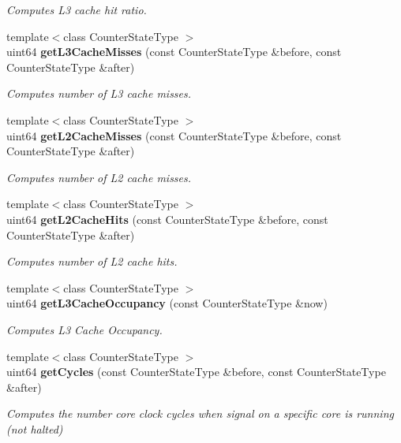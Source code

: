 \begin{DoxyCompactItemize}
\begin{DoxyCompactList}\small\item\em Computes L3 cache hit ratio. \end{DoxyCompactList}\item 
{\footnotesize template$<$class Counter\+State\+Type $>$ }\\uint64 {\bf get\+L3\+Cache\+Misses} (const Counter\+State\+Type \&before, const Counter\+State\+Type \&after)
\begin{DoxyCompactList}\small\item\em Computes number of L3 cache misses. \end{DoxyCompactList}\item 
{\footnotesize template$<$class Counter\+State\+Type $>$ }\\uint64 {\bf get\+L2\+Cache\+Misses} (const Counter\+State\+Type \&before, const Counter\+State\+Type \&after)
\begin{DoxyCompactList}\small\item\em Computes number of L2 cache misses. \end{DoxyCompactList}\item 
{\footnotesize template$<$class Counter\+State\+Type $>$ }\\uint64 {\bf get\+L2\+Cache\+Hits} (const Counter\+State\+Type \&before, const Counter\+State\+Type \&after)
\begin{DoxyCompactList}\small\item\em Computes number of L2 cache hits. \end{DoxyCompactList}\item 
{\footnotesize template$<$class Counter\+State\+Type $>$ }\\uint64 {\bf get\+L3\+Cache\+Occupancy} (const Counter\+State\+Type \&now)
\begin{DoxyCompactList}\small\item\em Computes L3 Cache Occupancy. \end{DoxyCompactList}\item 
{\footnotesize template$<$class Counter\+State\+Type $>$ }\\uint64 {\bf get\+Cycles} (const Counter\+State\+Type \&before, const Counter\+State\+Type \&after)
\begin{DoxyCompactList}\small\item\em Computes the number core clock cycles when signal on a specific core is running (not halted) \end{DoxyCompactList}\item 

\end{DoxyCompactItemize}
